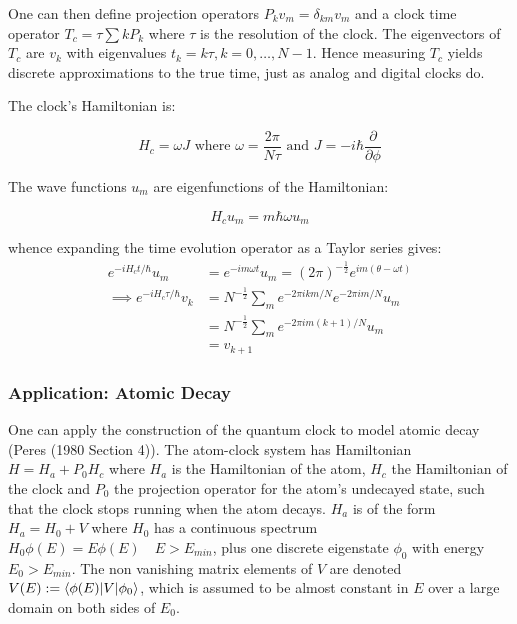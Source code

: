 \documentclass{article}
\begin{document}
\noindent One can then define projection operators $P_kv_m=\delta_{km}v_m$ and a clock time operator $T_c = \tau\sum{kP_k}$ where $\tau$ is the resolution of the clock. The eigenvectors of $T_c$ are $v_k$ with eigenvalues $t_k = k\tau, k=0,\dots,N-1$. Hence measuring $T_c$ yields discrete approximations to the true time, just as analog and digital clocks do. 

\noindent The clock's Hamiltonian is:

\begin{equation}
	H_c = \omega J \text{ where } \omega = \frac{2\pi}{N\tau} \text{ and } J=-i\hbar \frac{\partial}{\partial\phi}
	\label{clockhamiltonian}
\end{equation}

\noindent The wave functions $u_m$ are eigenfunctions of the Hamiltonian:

\begin{equation}
	H_cu_m = m\hbar\omega u_m
	\label{clockwavefunctions}
\end{equation}

\noindent whence expanding the time evolution operator as a Taylor series gives:
\begin{subequations}
\begin{align}
	e^{-iH_ct/\hbar}u_m &= e^{-im\omega t}u_m = (2\pi)^{-\frac{1}{2}}e^{im(\theta-\omega t)} \\
	\implies e^{-iH_c\tau/\hbar}v_k &= N^{-\frac{1}{2}}\sum_{m}e^{-2\pi ikm/N}e^{-2\pi im/N}u_m \\
						       &= N^{-\frac{1}{2}}\sum_{m}e^{-2\pi im(k+1)/N}u_m \\
						       &= v_{k+1}
\end{align}
\end{subequations}

\subsubsection{Application: Atomic Decay}
One can apply the construction of the quantum clock to model atomic decay (Peres (1980 Section 4)). The atom-clock system has Hamiltonian $H=H_a+P_0H_c$ where $H_a$ is the Hamiltonian of the atom, $H_c$ the Hamiltonian of the clock and $P_0$ the projection operator for the atom's undecayed state, such that the clock stops running when the atom decays. $H_a$ is of the form $H_a=H_0+V$ where $H_0$ has a continuous spectrum $H_0\phi(E) = E\phi(E) \quad E>E_{min}$, plus one discrete eigenstate $\phi_0$ with energy $E_0>E_{min}$. The non vanishing matrix elements of $V$ are denoted $V(E) := \braket{\phi(E)|V|\phi_0}$, which is assumed to be almost constant in $E$ over a large domain on both sides of $E_0$.
\end{document}
